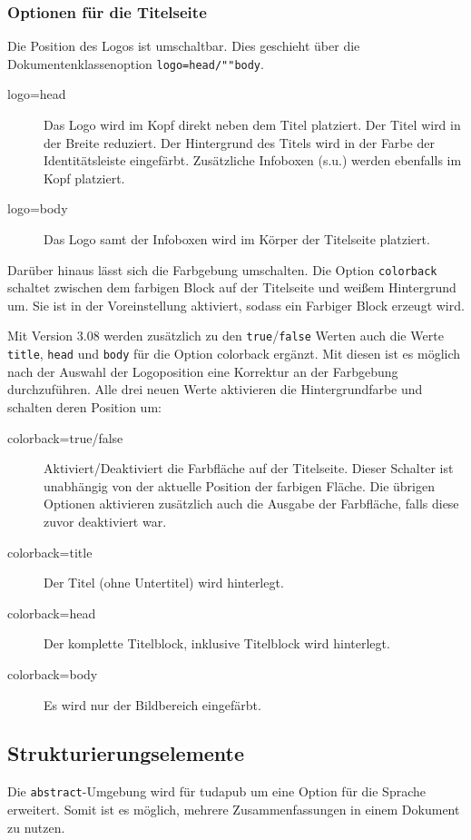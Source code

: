 \documentclass[
	ngerman,
	accentcolor=9c,%
	]{tudapub}
\let\code\texttt
\let\cls\textsf
\begin{document}
\subsubsection{Optionen für die Titelseite}
Die Position des Logos ist umschaltbar. Dies geschieht über die Dokumentenklassenoption \code{logo=head/""body}.
\begin{description}
	\item[logo=head] Das Logo wird im Kopf direkt neben dem Titel platziert. Der Titel wird in der Breite reduziert. Der Hintergrund des Titels wird in der Farbe der Identitätsleiste eingefärbt. Zusätzliche Infoboxen (s.u.) werden ebenfalls im Kopf platziert.
	\item[logo=body] Das Logo samt der Infoboxen wird im Körper der Titelseite platziert.
\end{description}

Darüber hinaus lässt sich die Farbgebung umschalten.
Die Option \code{colorback} schaltet zwischen dem farbigen Block auf der Titelseite und weißem Hintergrund um. Sie ist in der Voreinstellung aktiviert, sodass ein Farbiger Block erzeugt wird.

Mit Version 3.08 werden zusätzlich zu den \code{true}/\code{false} Werten auch die Werte \code{title}, \code{head} und \code{body} für die Option colorback ergänzt.
Mit diesen ist es möglich nach der Auswahl der Logoposition eine Korrektur an der Farbgebung durchzuführen. Alle drei neuen Werte aktivieren die Hintergrundfarbe und schalten deren Position um:
\begin{description}
	\item[colorback=true/false] Aktiviert/Deaktiviert die Farbfläche auf der Titelseite. Dieser Schalter ist unabhängig von der aktuelle Position der farbigen Fläche. Die übrigen Optionen aktivieren zusätzlich auch die Ausgabe der Farbfläche, falls diese zuvor deaktiviert war.
	\item[colorback=title] Der Titel (ohne Untertitel) wird hinterlegt.
	\item[colorback=head] Der komplette Titelblock, inklusive Titelblock wird hinterlegt.
	\item[colorback=body] Es wird nur der Bildbereich eingefärbt.
\end{description}

\subsection{Strukturierungselemente}
Die \code{abstract}-Umgebung wird für \cls{tudapub} um eine Option für die Sprache erweitert. Somit ist es möglich, mehrere Zusammenfassungen in einem Dokument zu nutzen.
\end{document}
